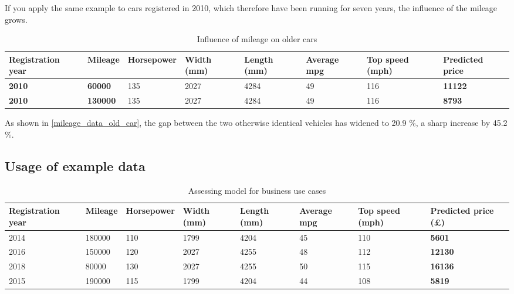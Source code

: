 If you apply the same example to cars registered in 2010, which therefore have been running for seven years, the influence of the mileage grows.
\begin{table}[H]
    \begin{adjustbox}{width={\textwidth}}
        \begin{tabular}{|l|l|l|l|l|l|l|l|}
            \hline
            \textbf{Registration year} & \textbf{Mileage} & Horsepower & Width (mm) & Length (mm) & Average mpg & Top speed (mph) & \textbf{Predicted price} \\ \hline
            \textbf{2010}              & \textbf{60000}   & 135        & 2027       & 4284        & 49          & 116             & \textbf{11122}           \\\hline
            \textbf{2010}              & \textbf{130000}  & 135        & 2027       & 4284        & 49          & 116             & \textbf{8793}           \\\hline
        \end{tabular}
    \end{adjustbox}
    \caption{Influence of mileage on older cars}
    \label{mileage_data_old_car}
\end{table}
As shown in \autoref{mileage_data_old_car}, the gap between the two otherwise identical vehicles has widened to 20.9 \%, a sharp increase by 45.2 \%.


\subsection{Usage of example data}
\begin{table}[H]
    \begin{adjustbox}{width={\textwidth}}
        \begin{tabular}{|l|l|l|l|l|l|l|l|}
            \hline
            Registration year & Mileage & Horsepower & Width (mm) & Length (mm) & Average mpg & Top speed (mph) & \textbf{Predicted price (£)} \\\hline
            2014              & 180000  & 110        & 1799       & 4204        & 45          & 110             & \textbf{5601}                \\\hline
            2016              & 150000  & 120        & 2027       & 4255        & 48          & 112             & \textbf{12130}               \\\hline
            2018              & 80000   & 130        & 2027       & 4255        & 50          & 115             & \textbf{16136}               \\\hline
            2015              & 190000  & 115        & 1799       & 4204        & 44          & 108             & \textbf{5819}                \\ \hline
        \end{tabular}
    \end{adjustbox}
    \caption{Assessing model for business use cases}
    \label{predicted_price_realworld_data}
\end{table}
